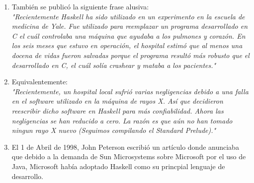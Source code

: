 \documentclass{article}
\begin{document}
\begin{itemize}
\begin{enumerate}
			\item También se publicó la siguiente frase alusiva: \\ \textit{"Recientemente Haskell ha sido utilizado en un experimento en la escuela de medicina de Yale. Fue utilizado para reemplazar un programa desarrollado en C el cuál controlaba una máquina que ayudaba a los pulmones y corazón. En los seis meses que estuvo en operación, el hospital estimó que al menos una docena de vidas fueron salvadas porque el programa resultó más robusto que el desarrollado en C, el cuál solía crashear y mataba a los pacientes."}
			\item Equivalentemente: \\ \textit{"Recientemente, un hospital local sufrió varias negligencias debido a una falla en el software utilizado en la máquina de rayos X. Así que decidieron reescribir dicho software en Haskell para más confiabilidad. Ahora las negligencias se han reducido a cero. La razón es que aún no han tomado ningun rayo X nuevo (Seguimos compilando el Standard Prelude)."}
			\item El 1 de Abril de 1998, John Peterson escribió un artículo donde anunciaba que debido a la demanda de Sun Microsystems sobre Microsoft por el uso de Java, Microsoft había adoptado Haskell como su princpial lenguaje de desarrollo. 
		\end{enumerate}
\end{itemize}
\end{document}
